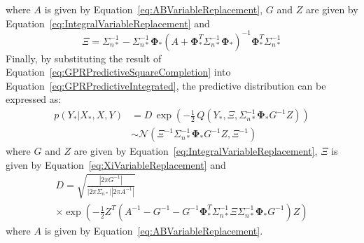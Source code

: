 \documentclass{article}
\begin{document}
where $A$ is given by Equation~\eqref{eq:ABVariableReplacement}, $G$ and $Z$ are given by Equation~\eqref{eq:IntegralVariableReplacement} and
\begin{equation}
\label{eq:XiVariableReplacement}
	\Xi = \Sigma_{n*}^{-1} - \Sigma_{n*}^{-1} \mathbf{\Phi}_* \left(A + \mathbf{\Phi}_*^T \Sigma_{n*}^{-1} \mathbf{\Phi}_*\right)^{-1} \mathbf{\Phi}_*^T \Sigma_{n*}^{-1}
\end{equation}
Finally, by substituting the result of Equation~\eqref{eq:GPRPredictiveSquareCompletion} into Equation~\eqref{eq:GPRPredictiveIntegrated}, the predictive distribution can be expressed as:
\begin{equation}
\label{eq:GPRPredictiveFinal}
	\begin{aligned}
	p\!\left(Y_*|X_*,X,Y\right) &= D \, \exp\!\left(-\frac{1}{2} \, Q\!\left(Y_*,\Xi,\Sigma_{n*}^{-1} \mathbf{\Phi}_* G^{-1} Z\right)\right) \\
	&\sim \mathcal{N}\!\left(\Xi^{-1} \Sigma_{n*}^{-1} \mathbf{\Phi}_* G^{-1} Z,\Xi^{-1}\right)
	\end{aligned}
\end{equation}
where $G$ and $Z$ are given by Equation~\eqref{eq:IntegralVariableReplacement}, $\Xi$ is given by Equation~\eqref{eq:XiVariableReplacement} and
\begin{multline}
\label{eq:GPRPredictiveNormalization}
	D = \sqrt{\frac{\left|2 \pi G^{-1}\right|}{\left|2 \pi \Sigma_{n*}\right| \left|2 \pi A^{-1}\right|}} \\
	\times \exp\!\left(-\frac{1}{2} Z^T \! \left(A^{-1} - G^{-1} - G^{-1} \mathbf{\Phi}_*^T \Sigma_{n*}^{-1} \Xi \Sigma_{n*}^{-1} \mathbf{\Phi}_* G^{-1}\right) Z\right)
\end{multline}
where $A$ is given by Equation~\eqref{eq:ABVariableReplacement}.
\end{document}
